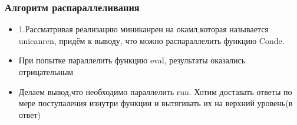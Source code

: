 \documentclass{beamer}
\begin{document}

\begin{frame}
  \frametitle{Алгоритм распараллеливания}
  \begin{itemize}
    \item 1.Рассматривая реализацию миниканрен на окамл,которая называется unicanren,
          придём к выводу, что можно распараллелить функцию Conde.
    \item При попытке параллелить функцию eval, результаты оказались отрицательным
    \item Делаем вывод,что необходимо параллелить run. Хотим доставать ответы по мере поступаления изнутри функции и вытягивать их на верхний уровень(в ответ)
  \end{itemize}
\end{frame}
\end{document}

